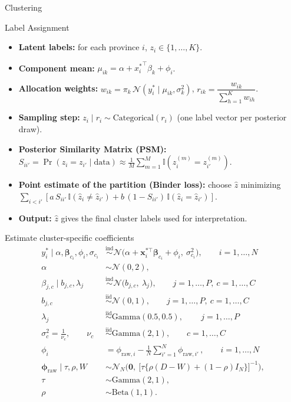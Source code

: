\begin{section}{Clustering}
\begin{frame}{Label Assignment}
\footnotesize
   \begin{itemize}
      \item \textbf{Latent labels:} for each province $i$, $z_i \in \{1,\dots,K\}$.
      \item \textbf{Component mean:} $\mu_{ik} = \alpha + {x_i^*}^\top \beta_k + \phi_i$.
      \item \textbf{Allocation weights:} $w_{ik} = \pi_k \, \mathcal{N}\!\left(y_i^* \mid \mu_{ik}, \sigma_k^2\right)$,\quad
            $r_{ik} = \dfrac{w_{ik}}{\sum_{h=1}^K w_{ih}}$.
      \item \textbf{Sampling step:} $z_i \mid r_i \sim \text{Categorical}(r_i)$ (one label vector per posterior draw).
      \item \textbf{Posterior Similarity Matrix (PSM):} $S_{ii'} = \Pr(z_i = z_{i'} \mid \text{data}) \approx \frac{1}{M}\sum_{m=1}^M \mathbb{I}\!\left(z_i^{(m)}=z_{i'}^{(m)}\right)$.
      \item \textbf{Point estimate of the partition (Binder loss):} choose $\hat z$ minimizing
            $\sum_{i<i'} \left[a\, S_{ii'}\,\mathbb{I}(\hat z_i \neq \hat z_{i'}) + b\, (1-S_{ii'})\,\mathbb{I}(\hat z_i = \hat z_{i'})\right]$.
      \item \textbf{Output:} $\hat z$ gives the final cluster labels used for interpretation.
    \end{itemize}
\end{frame}

\begin{frame}{Estimate cluster-specific coefficients}
\tiny
\begin{align*}
y_i^\ast \mid \alpha,\boldsymbol{\beta}_{c_i},\phi_i,\sigma_{c_i}
&\stackrel{\text{ind}}{\sim} \mathcal{N}\!\Big(\alpha+\mathbf{x}_i^{\ast\top}\boldsymbol{\beta}_{c_i}+\phi_i,\ \sigma_{c_i}^{2}\Big),
\qquad i=1,\dots,N\\
\alpha &\sim \mathcal{N}(0,2),\\
\beta_{j,c}\mid b_{j,c},\lambda_{j}
&\stackrel{\text{ind}}{\sim} \mathcal{N}\!\Big(b_{j,c},\ \lambda_{j} \Big),
\qquad j=1,\dots,P,\ c=1,\dots,C\\
b_{j,c} &\stackrel{\text{iid}}{\sim} \mathcal{N}(0,1),
\qquad j=1,\dots,P,\ c = 1,\dots,C\\
\lambda_{j} &\stackrel{\text{iid}}{\sim} \mathrm{Gamma}(0.5,0.5), \,
\qquad j=1,\dots,P\\
\sigma^2_c = \frac{1}{\nu_c}, \qquad \nu_c &\stackrel{\text{iid}}{\sim} \mathrm{Gamma}(2,1),
\qquad c=1,\dots,C\\
\phi_i &= \phi_{\mathrm{raw},i}-\frac1N\sum_{i'=1}^N \phi_{\mathrm{raw},i'} \, ,
\qquad i=1,\dots,N\\
\boldsymbol{\phi}_{\mathrm{raw}}\mid \tau,\rho,W
&\sim \mathcal{N}_N\!\Big(
\mathbf{0},\ \big[\tau\{\rho(D-W)+(1-\rho)I_N\}\big]^{-1}
\Big),\\
\tau &\sim \mathrm{Gamma}(2,1),\\
\rho &\sim \mathrm{Beta}(1,1).
\end{align*}
\end{frame}

\end{section}